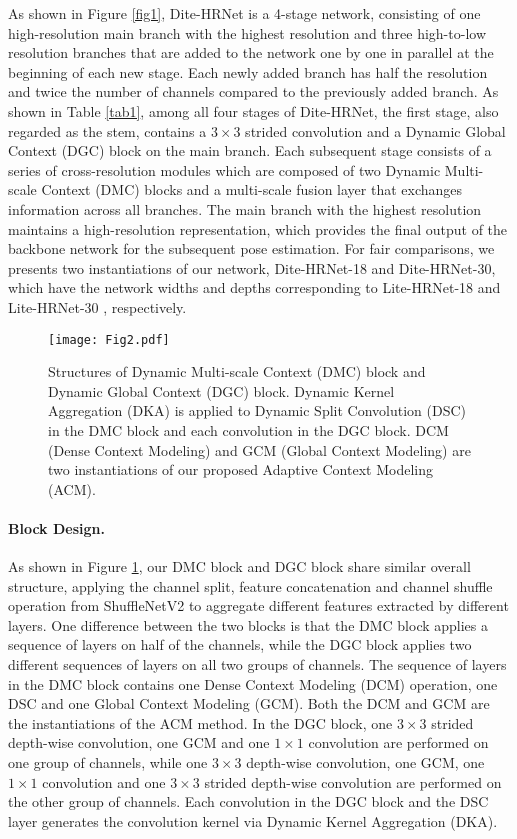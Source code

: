 \documentclass{article}
\begin{document}
As shown in Figure \ref{fig1}, Dite-HRNet is a 4-stage network, consisting of one high-resolution main branch with the highest resolution and three high-to-low resolution branches that are added to the network one by one in parallel at the beginning of each new stage. Each newly added branch has half the resolution and twice the number of channels compared to the previously added branch. As shown in Table \ref{tab1}, among all four stages of Dite-HRNet, the first stage, also regarded as the stem, contains a $3 \times 3$ strided convolution and a Dynamic Global Context (DGC) block on the main branch. Each subsequent stage consists of a series of cross-resolution modules which are composed of two Dynamic Multi-scale Context (DMC) blocks and a multi-scale fusion layer that exchanges information across all branches. The main branch with the highest resolution maintains a high-resolution representation, which provides the final output of the backbone network for the subsequent pose estimation. For fair comparisons, we presents two instantiations of our network, Dite-HRNet-18 and Dite-HRNet-30, which have the network widths and depths corresponding to Lite-HRNet-18 \cite{yu:litehrnet} and Lite-HRNet-30 \cite{yu:litehrnet}, respectively.



\begin{figure}[t]
\centering
\texttt{[image: Fig2.pdf]}
\caption{Structures of Dynamic Multi-scale Context (DMC) block and Dynamic Global Context (DGC) block. Dynamic Kernel Aggregation (DKA) is applied to Dynamic Split Convolution (DSC) in the DMC block and each convolution in the DGC block. DCM (Dense Context Modeling) and GCM (Global Context Modeling) are two instantiations of our proposed Adaptive Context Modeling (ACM).}
\label{fig2}
\end{figure}

\paragraph{Block Design.} As shown in Figure \ref{fig2}, our DMC block and DGC block share similar overall structure, applying the channel split, feature concatenation and channel shuffle operation from ShuffleNetV2 \cite{ma:shuffle2} to aggregate different features extracted by different layers. One difference between the two blocks is that the DMC block applies a sequence of layers on half of the channels, while the DGC block applies two different sequences of layers on all two groups of channels. The sequence of layers in the DMC block contains one Dense Context Modeling (DCM) operation, one DSC and one Global Context Modeling (GCM). Both the DCM and GCM are the instantiations of the ACM method. In the DGC block, one $3 \times 3$ strided depth-wise convolution, one GCM and one $1 \times 1$ convolution are performed on one group of channels, while one $3 \times 3$ depth-wise convolution, one GCM, one $1 \times 1$ convolution and one $3 \times 3$ strided depth-wise convolution are performed on the other group of channels. Each convolution in the DGC block and the DSC layer generates the convolution kernel via Dynamic Kernel Aggregation (DKA).
\end{document}
